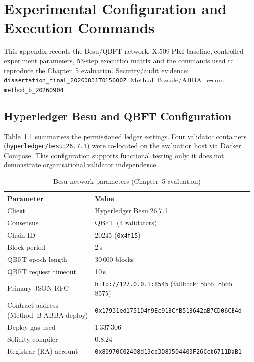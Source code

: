 
\chapter{Experimental Configuration and Execution Commands}
\label{app:experimental-config}

This appendix records the Besu/QBFT network, X.509 PKI baseline, controlled experiment parameters, 53-step execution matrix and the commands used to reproduce the Chapter~5 evaluation. Security/audit evidence: \texttt{dissertation\_final\_20260831T015600Z}. Method~B scale/ABBA re-run: \texttt{method\_b\_20260904}.

\section{Hyperledger Besu and QBFT Configuration}
\label{app:besu-config}

Table~\ref{tab:app-besu-params} summarises the permissioned ledger settings. Four validator containers (\texttt{hyperledger/besu:26.7.1}) were co-located on the evaluation host via Docker Compose. This configuration supports functional testing only; it does not demonstrate organisational validator independence.

\begin{table}[htbp]
    \centering
    \caption{Besu network parameters (Chapter~5 evaluation)}
    \label{tab:app-besu-params}
    \begin{tabular}{|l|l|}
        \hline
        \textbf{Parameter} & \textbf{Value} \\
        \hline
        Client & Hyperledger Besu 26.7.1 \\
        \hline
        Consensus & QBFT (4 validators) \\
        \hline
        Chain ID & 20245 (\texttt{0x4f15}) \\
        \hline
        Block period & 2\,s \\
        \hline
        QBFT epoch length & 30\,000 blocks \\
        \hline
        QBFT request timeout & 10\,s \\
        \hline
        Primary JSON-RPC & \texttt{http://127.0.0.1:8545} (fallback: 8555, 8565, 8575) \\
        \hline
        Contract address (Method~B ABBA deploy) & \texttt{0x17931ed1751D4f9Ec918CfB518642aB7CD06CB4d} \\
        \hline
        Deploy gas used & 1\,337\,306 \\
        \hline
        Solidity compiler & 0.8.24 \\
        \hline
        Registrar (RA) account & \texttt{0x80970C02408d19cc3D8D504400F26Ccb6711DaB1} \\
        \hline
    \end{tabular}
\end{table}

